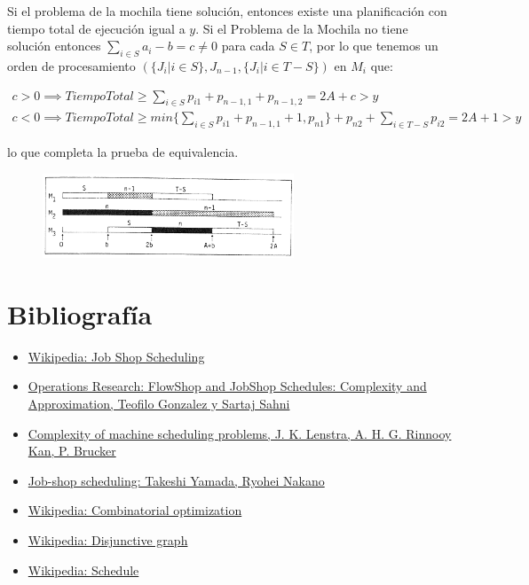 \documentclass[11pt, a4paper,spanish]{article}
\begin{document}
					Si el problema de la mochila tiene solución, entonces existe una planificación con tiempo total de ejecución igual a $y$. Si el Problema de la Mochila no tiene solución entonces  $\sum_{i\in S}a_{i} - b = c \neq 0$ para cada  $S \in T$, por lo que tenemos un orden de procesamiento $( \{J_{i} | i \in S\},J_{n-1} , \{J_{i} | i \in T-S\})$ en $M_{i}$ que:

					\begin{gather}
						c > 0 \implies  TiempoTotal \geq \sum_{i\in S}p_{i1} + p_{n-1,1} + p_{n-1, 2} = 2A + c > y\\ 
						c < 0 \implies  TiempoTotal \geq  min\{ \sum_{i\in S}p_{i1} +p_{n-1,1}+1,p_{n1} \}+ p_{n2}  + \sum_{i\in T-S}p_{i2} = 2A + 1 > y
					\end{gather}
					
					lo que completa la prueba de equivalencia.
					
					\begin{figure}[H]
						\centering
						\includegraphics[width=75mm]{res/example2.png}
					\end{figure}

	\newpage

		\section{Bibliografía}

			\begin{itemize}
			
				\item \href{https://en.wikipedia.org/wiki/Job_shop_scheduling}{Wikipedia: Job Shop Scheduling}
				\item \href{http://www.rspq.org/pubs/gonz.pdf}{Operations Research: FlowShop and JobShop Schedules: Complexity and Approximation, Teofilo Gonzalez y Sartaj Sahni}
				\item \href{http://oai.cwi.nl/oai/asset/18051/18051A.pdf}{Complexity of machine scheduling problems, J. K. Lenstra, A. H. G. Rinnooy Kan, P. Brucker}
				\item \href{http://www.kecl.ntt.co.jp/as/members/yamada/galbk.pdf}{Job-shop scheduling: Takeshi Yamada, Ryohei Nakano}
				\item \href{https://en.wikipedia.org/wiki/Combinatorial_optimization}{Wikipedia: Combinatorial optimization}
				\item \href{https://en.wikipedia.org/wiki/Disjunctive_graph}{Wikipedia: Disjunctive graph}
				\item \href{https://en.wikipedia.org/wiki/Schedule_(computer_science)}{Wikipedia: Schedule}

			\end{itemize}
\end{document}
